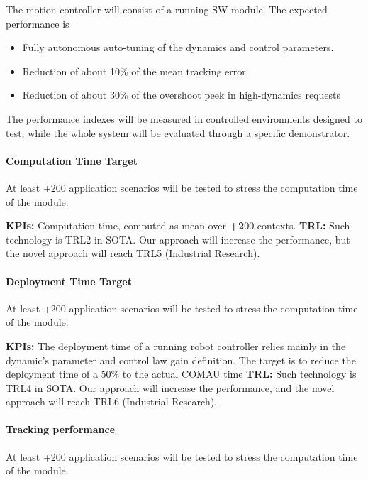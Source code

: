 The motion controller will consist of a running SW module. The expected
performance is

\begin{itemize}
\item
  Fully autonomous auto-tuning of the dynamics and control parameters.
\item
  Reduction of about 10\% of the mean tracking error
\item
  Reduction of about 30\% of the overshoot peek in high-dynamics
  requests
\end{itemize}

The performance indexes will be measured in controlled environments
designed to test, while the whole system will be evaluated through a
specific demonstrator.

\paragraph{Computation Time Target}\label{computation-time-target-1}

At least +200 application scenarios will be tested to stress the
computation time of the module.

\textbf{KPIs:} Computation time, computed as mean over \textbf{+2}00
contexts. \textbf{\textbar{} TRL:} Such technology is TRL2 in SOTA. Our
approach will increase the performance, but the novel approach will
reach TRL5 (Industrial Research).

\paragraph{Deployment Time Target}\label{deployment-time-target}

At least +200 application scenarios will be tested to stress the
computation time of the module.

\textbf{KPIs:} The deployment time of a running robot controller relies
mainly in the dynamic's parameter and control law gain definition. The
target is to reduce the deployment time of a 50\% to the actual COMAU
time \textbf{\textbar{} TRL:} Such technology is TRL4 in SOTA. Our
approach will increase the performance, and the novel approach will
reach TRL6 (Industrial Research).

\paragraph{Tracking performance}\label{tracking-performance}

At least +200 application scenarios will be tested to stress the
computation time of the module.

